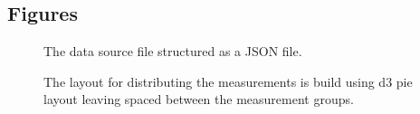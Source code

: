 \documentclass[twocolumn]{bmcart}%
\begin{document}
\begin{backmatter}





\section*{Figures}


\begin{figure}[h!]
  \caption{ The data source file structured as a JSON file.}
  \label{codeDataSource}
\end{figure}

\begin{figure}[h!]
  \caption{ The layout for distributing the measurements is build using d3 pie layout leaving spaced between the measurement groups.}
  \label{codeLayoutConstruction}
\end{figure}


\end{backmatter}
\end{document}
